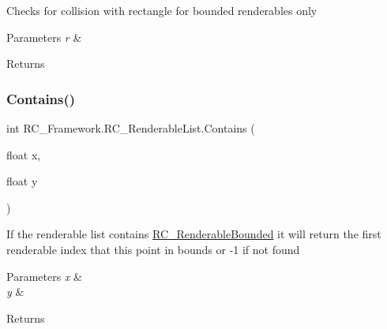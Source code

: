 Checks for collision with rectangle for bounded renderables only 


\begin{DoxyParams}{Parameters}
{\em r} & \\
\hline
\end{DoxyParams}
\begin{DoxyReturn}{Returns}

\end{DoxyReturn}
\mbox{\label{class_r_c___framework_1_1_r_c___renderable_list_afab33aa056d75a88414f62576aa0cbd9}} 
\subsubsection{\texorpdfstring{Contains()}{Contains()}}
{\footnotesize\ttfamily int R\+C\+\_\+\+Framework.\+R\+C\+\_\+\+Renderable\+List.\+Contains (\begin{DoxyParamCaption}\item[{float}]{x,  }\item[{float}]{y }\end{DoxyParamCaption})}



If the renderable list contains \mbox{\hyperlink{class_r_c___framework_1_1_r_c___renderable_bounded}{R\+C\+\_\+\+Renderable\+Bounded}} it will return the first renderable index that this point in bounds or -\/1 if not found 


\begin{DoxyParams}{Parameters}
{\em x} & \\
\hline
{\em y} & \\
\hline
\end{DoxyParams}
\begin{DoxyReturn}{Returns}

\end{DoxyReturn}
\mbox{\label{class_r_c___framework_1_1_r_c___renderable_list_a89f525ac211787c14d1b16f925bc4558}} 

